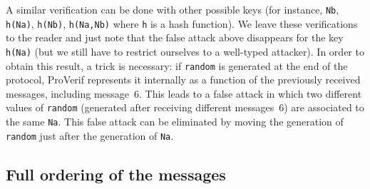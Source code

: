 \documentclass{book}
\begin{document}
A similar verification can be done with other possible keys (for instance, \lstinline!Nb!,
\lstinline!h(Na)!, \lstinline!h(Nb)!, \lstinline!h(Na,Nb)! where
\lstinline!h!  is a hash function). We leave these verifications to
the reader and just note that the false attack above disappears for
the key \lstinline!h(Na)! (but we still have to restrict ourselves to
a well-typed attacker). In order to obtain this result, a trick is
necessary: if \lstinline!random! is generated at the end of the
protocol, ProVerif represents it internally as a function of the
previously received messages, including message~6. This leads to a
false attack in which two different values of \lstinline!random!
(generated after receiving different messages~6) are associated to the
same \lstinline!Na!. This false attack can be eliminated by moving the
generation of \lstinline!random! just after the generation of
\lstinline!Na!.

\subsection{Full ordering of the messages}
\label{sec:all-messages}
\end{document}
